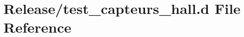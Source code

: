 \hypertarget{test__capteurs__hall_8d}{}\section{Release/test\+\_\+capteurs\+\_\+hall.d File Reference}
\label{test__capteurs__hall_8d}
